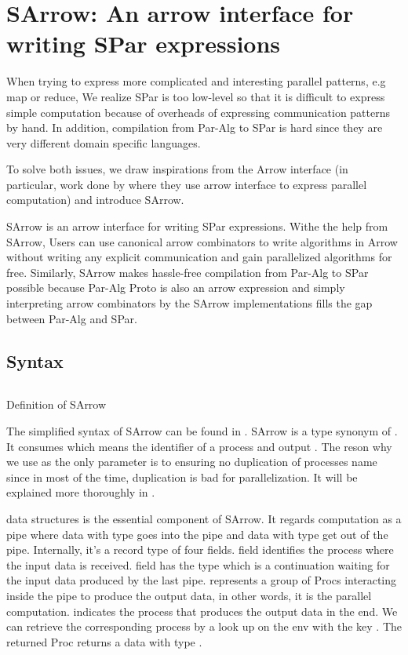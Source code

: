 \chapter{SArrow: An arrow interface for writing SPar expressions} \label{chap:arrow}
When trying to express more complicated and interesting parallel patterns, e.g map or reduce, We realize SPar is too low-level so that it is difficult to express simple computation because of overheads of expressing communication patterns by hand. In addition, compilation from Par-Alg to SPar is hard since they are very different domain specific languages. 

To solve both issues, we draw inspirations from the Arrow interface (in particular, work done by \cite{braunArrowsParallelComputation2018} where they use arrow interface to express parallel computation) and introduce SArrow.

SArrow is an arrow interface for writing SPar expressions. Withe the help from SArrow, Users can use canonical arrow combinators to write algorithms in Arrow without writing any explicit communication and gain parallelized algorithms for free. Similarly, SArrow makes hassle-free compilation from Par-Alg to SPar possible because Par-Alg Proto is also an arrow expression and simply interpreting arrow combinators by the SArrow implementations fills the gap between Par-Alg and SPar. 

\section{Syntax}
\begin{listing}[ht]
\inputminted{Haskell}{arrow/def.hs} 
\caption{Definition of SArrow}
\label{SArrow:def}
\end{listing}
The simplified syntax of SArrow can be found in . SArrow is a type synonym of . It consumes  which means the identifier of a process and output . The reson why we use  as the only parameter is to ensuring no duplication of processes name since in most of the time, duplication is bad for parallelization. It will be explained more thoroughly in .

 data structures is the essential component of SArrow. It regards computation as a pipe where data with type  goes into the pipe and data with type  get out of the pipe. Internally, it's a record type of four fields.  field identifies the process where the input data is received.  field has the type  which is a continuation waiting for the input data produced by the last pipe.  represents a group of Procs interacting inside the pipe to produce the output data, in other words, it is the parallel computation.  indicates the process that produces the output data in the end. We can retrieve the corresponding process by a look up on the env with the key . The returned Proc returns a data with type .
